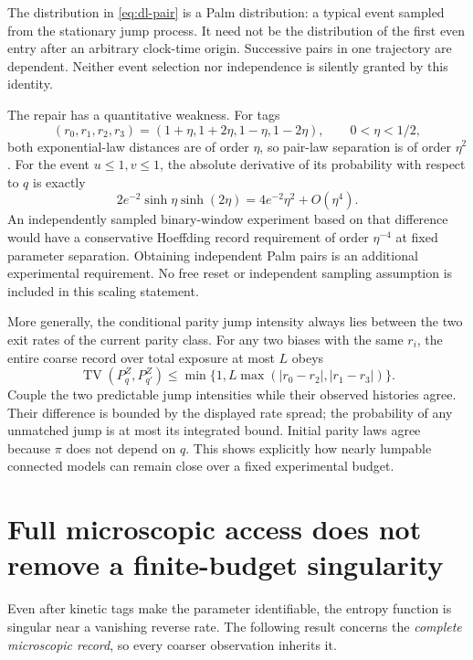 The distribution in \eqref{eq:dl-pair} is a Palm distribution: a typical event
sampled from the stationary jump process. It need not be the distribution of
the first even entry after an arbitrary clock-time origin. Successive pairs
in one trajectory are dependent. Neither event selection nor independence is
silently granted by this identity.

The repair has a quantitative weakness. For tags
\[
 (r_0,r_1,r_2,r_3)=(1+\eta,1+2\eta,1-\eta,1-2\eta),
 \qquad0<\eta<1/2,
\]
both exponential-law distances are of order $\eta$, so pair-law separation is
of order $\eta^2$. For the event $u\le1,v\le1$, the absolute derivative of its
probability with respect to $q$ is exactly
\begin{equation}
 2e^{-2}\sinh\eta\sinh(2\eta)
   =4e^{-2}\eta^2+O(\eta^4).                            \label{eq:dl-tag-signal}
\end{equation}
An independently sampled binary-window experiment based on that difference
would have a conservative Hoeffding record requirement of order $\eta^{-4}$
at fixed parameter separation. Obtaining independent Palm pairs is an additional
experimental requirement. No free reset or independent sampling assumption is
included in this scaling statement.

More generally, the conditional parity jump intensity always lies between the
two exit rates of the current parity class. For any two biases with the same
$r_i$, the entire coarse record over total exposure at most $L$ obeys
\begin{equation}
 \operatorname{TV}(P_q^Z,P_{q'}^Z)
 \le\min\{1,L\max(|r_0-r_2|,|r_1-r_3|)\}.              \label{eq:dl-coarse-coupling}
\end{equation}
Couple the two predictable jump intensities while their observed histories
agree. Their difference is bounded by the displayed rate spread; the probability
of any unmatched jump is at most its integrated bound. Initial parity laws
agree because $\pi$ does not depend on $q$. This shows explicitly how nearly
lumpable connected models can remain close over a fixed experimental budget.

\section{Full microscopic access does not remove a finite-budget singularity}
Even after kinetic tags make the parameter identifiable, the entropy function
is singular near a vanishing reverse rate. The following result concerns the
\emph{complete microscopic record}, so every coarser observation inherits it.

